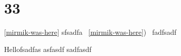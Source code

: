 
\section*{33}
\ref{mirmik-was-here} sfsadfa ~\ref{mirmik-was-here})~
\pageref{mirmik-was-here} fadfsadf

Hellofsadfas
asfasdf
sadfasdf